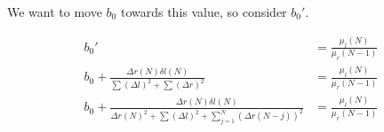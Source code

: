 \documentclass[12pt]{article}
\begin{document}
We want to move $b_0$ towards this value, so consider $b_0'$.

\begin{align*}
    b_0' &= \frac{\mu_l(N)}{\mu_r(N - 1)}\\
    b_0 + \frac{\Delta r(N) \delta l(N)}{\sum (\Delta l)^2 + \sum (\Delta r)^2} &= \frac{\mu_l(N)}{\mu_r(N - 1)}\\
    b_0 + \frac{\Delta r(N) \delta l(N)}{\Delta r(N)^2 + \sum (\Delta l)^2
    + \sum _{j = 1}^N (\Delta r(N - j))^2} &= \frac{\mu_l(N)}{\mu_r(N - 1)}\\
\end{align*}
\end{document}
